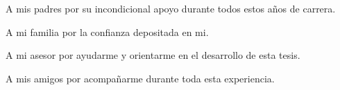 \thispagestyle{empty} %
    \null{}
        \begin{flushright}
                A mis padres por su incondicional apoyo durante todos estos años de carrera.
                
                A mi familia por la confianza depositada en mi.
                
                A mi asesor por ayudarme y orientarme en el desarrollo de esta tesis.
                
                A mis amigos por acompañarme durante toda esta experiencia.
        \end{flushright}
\null